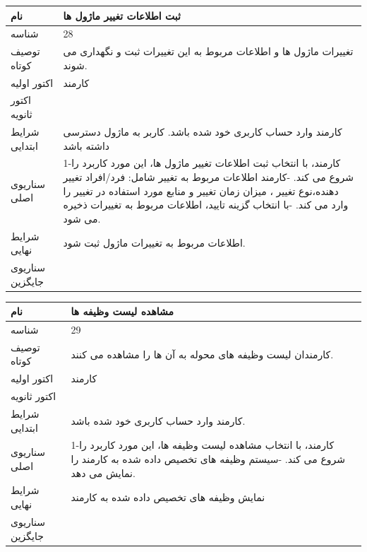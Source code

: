 \vspace{2cm}

\begin{tabular}{|p{2cm}|p{10cm}|}
\hline
نام
&
ثبت اطلاعات تغییر ماژول ها
\\
\hline
شناسه
&
28
\\
\hline
توصیف کوتاه  
&
تغییرات ماژول ها و اطلاعات مربوط به این تغییرات ثبت و نگهداری می شوند.
\\
\hline
اکتور اولیه
&
کارمند
\\
\hline
اکتور ثانویه
&

\\
\hline
شرایط ابتدایی
&
 کارمند وارد حساب کاربری خود شده باشد. 
 \newline
 کاربر به ماژول دسترسی داشته باشد

\\
\hline
سناریوی اصلی
&
1-کارمند، با انتخاب ثبت اطلاعات تغییر ماژول ها، این مورد کاربرد را شروع می کند.
\newline
2-کارمند اطلاعات مربوط به تغییر شامل: فرد/افراد تغییر دهنده،نوع تغییر ، میزان زمان تغییر و منابع مورد استفاده در تغییر را وارد می کند.
\newline
3-با انتخاب گزینه تایید، اطلاعات مربوط به تغییرات ذخیره می شود.
\\
\hline
شرایط نهایی
&
اطلاعات مربوط به تغییرات ماژول ثبت شود.
\\
\hline
سناریوی جایگزین
&

\\
\hline
\end{tabular}

\vspace{2cm}

\begin{tabular}{|p{2cm}|p{10cm}|}
\hline
نام
&
مشاهده لیست وظیفه ها
\\
\hline
شناسه
&
29
\\
\hline
توصیف کوتاه  
&
کارمندان لیست وظیفه های محوله به آن ها را مشاهده می کنند.
\\
\hline
اکتور اولیه
&
کارمند
\\
\hline
اکتور ثانویه
&

\\
\hline
شرایط ابتدایی
&
 کارمند وارد حساب کاربری خود شده باشد. 
\\
\hline
سناریوی اصلی
&
1-کارمند، با انتخاب مشاهده لیست وظیفه ها، این مورد کاربرد را شروع می کند.
\newline
2-سیستم وظیفه های تخصیص داده شده به کارمند را نمایش می دهد.
\\
\hline
شرایط نهایی
&
نمایش وظیفه های تخصیص داده شده به کارمند
\\
\hline
سناریوی جایگزین
&

\\
\hline
\end{tabular}

